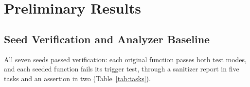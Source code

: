 \documentclass[12pt]{IEEEtran}
\begin{document}
\section{Preliminary Results}
\label{sec:results}

\subsection{Seed Verification and Analyzer Baseline}
All seven seeds passed verification: each original function passes both test modes, and each seeded function fails its trigger test, through a sanitizer report in five tasks and an assertion in two (Table~\ref{tab:tasks}).

\begin{table}[t]
    \centering
    \caption{Baseline before repair: security warnings and MISRA subset violations in the original (upstream) and seeded functions}
    \label{tab:baseline}
    \footnotesize
\end{table}
\end{document}
